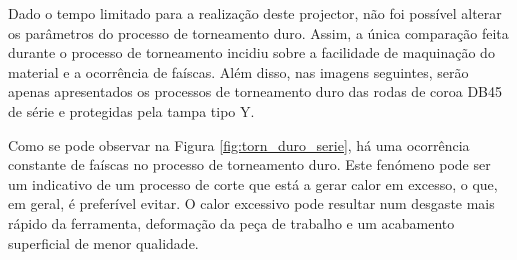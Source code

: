 \par
Dado o tempo limitado para a realização deste projector, não foi possível alterar os parâmetros do processo de torneamento duro. Assim, a única comparação feita durante o processo de torneamento incidiu sobre a facilidade de maquinação do material e a ocorrência de faíscas. Além disso, nas imagens seguintes, serão apenas apresentados os processos de torneamento duro das rodas de coroa DB45 de série e protegidas pela tampa tipo Y.

\par
Como se pode observar na Figura \ref{fig:torn_duro_serie}, há uma ocorrência constante de faíscas no processo de torneamento duro. Este fenómeno pode ser um indicativo de um processo de corte que está a gerar calor em excesso, o que, em geral, é preferível evitar. O calor excessivo pode resultar num desgaste mais rápido da ferramenta, deformação da peça de trabalho e um acabamento superficial de menor qualidade.

